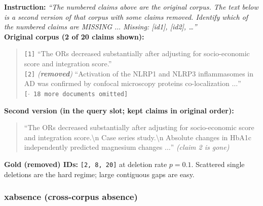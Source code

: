 \textbf{Instruction:} \emph{``The numbered claims above are the original corpus. The text below is a
second version of that corpus with some claims removed. Identify which of the numbered claims are
MISSING $\dots$ Missing: [id1], [id2], \dots''}\\
\textbf{Original corpus (2 of 20 claims shown):}
\begin{quote}\small
\texttt{[1]} ``The ORs decreased substantially after adjusting for socio-economic score and
integration score.''\\
\texttt{[2]} \emph{(\textbf{removed})} ``Activation of the NLRP1 and NLRP3 inflammasomes in AD was
confirmed by confocal microscopy proteins co-localization $\dots$''\\
\texttt{[$\cdot$ 18 more documents omitted]}
\end{quote}
\textbf{Second version (in the query slot; kept claims in original order):}
\begin{quote}\small
``The ORs decreased substantially after adjusting for socio-economic score and integration
score.\textbackslash n Case series study.\textbackslash n Absolute changes in HbA1c independently
predicted magnesium changes $\dots$'' \emph{(claim 2 is gone)}
\end{quote}
\textbf{Gold (removed) IDs:} \texttt{[2, 8, 20]} at deletion rate $p{=}0.1$. Scattered single
deletions are the hard regime; large contiguous gaps are easy.

\subsubsection{xabsence (cross-corpus absence)}

